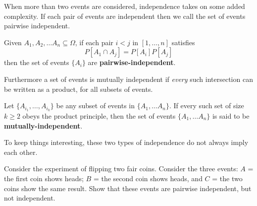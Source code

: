 \documentclass[../main.tex]{subfiles}
\begin{document}
\noindent
When more than two events are considered, independence takes on some added complexity. If each pair of events are independent then we call the set of events pairwise
independent.
\begin{definition}
	Given $A_1, A_2, \ldots A_n \subseteq \Omega$, if each pair $i<j$ in $[1,\ldots,n]$
	satisfies $$P[A_1 \cap A_j] = P[A_i]P[A_j]$$ then the set of events $\{A_i\}$
	are \textbf{pairwise-independent}.
\end{definition}
\noindent
Furthermore a set of events is mutually independent if \textit{every} such intersection
can be written as a product, for all subsets of events.
\begin{definition}
	Let $\{A_{i_1}, \ldots, A_{i_k}\}$ be any subset of events in $\{A_1, \ldots A_n\}$. If every such set of size $k \geq 2$ obeys the product principle, then the
	set of events $\{A_1, \ldots A_n\}$ is said to be \textbf{mutually-independent}.
\end{definition}
\noindent
To keep things interesting, these two types of independence do not always imply each other.
\begin{example}
Consider the experiment of 
flipping two fair coins. Consider the three events:
$A$ = the first coin shows heads; $B$ = the second coin shows heads, and $C$ =
the two coins show the same result. Show that these events are pairwise
independent, but not independent.
\end{example}
\end{document}
